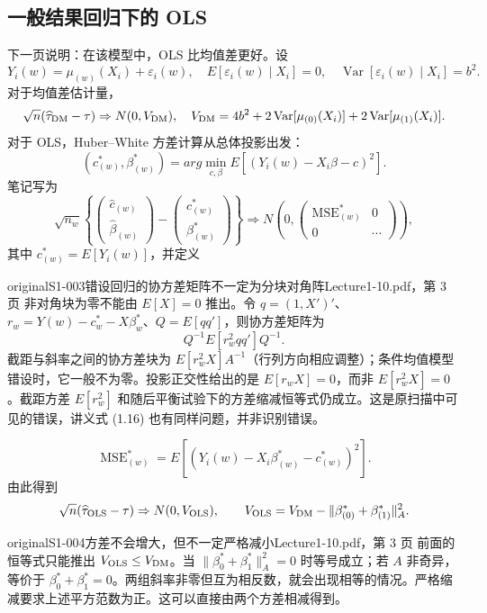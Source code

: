 \subsection{一般结果回归下的 OLS}
下一页说明：在该模型中，OLS 比均值差更好。设
\[
Y_i(w)=\mu_{(w)}(X_i)+\varepsilon_i(w),\quad
E[\varepsilon_i(w)\mid X_i]=0,\quad
\operatorname{Var}[\varepsilon_i(w)\mid X_i]=b^2.
\]
对于均值差估计量，
\[
\sqrt n(\widehat\tau_{\rm DM}-\tau)\Rightarrow N(0,V_{\rm DM}),\quad
V_{\rm DM}=4b^2+2\operatorname{Var}[\mu_{(0)}(X_i)]
+2\operatorname{Var}[\mu_{(1)}(X_i)].
\]
对于 OLS，Huber--White 方差计算从总体投影出发：
\[
(c^*_{(w)},\beta^*_{(w)})=arg\min_{c,\beta}
 E[(Y_i(w)-X_i\beta-c)^2].
\]
笔记写为
\[
\sqrt{n_w}\left\{\begin{pmatrix}\widehat c_{(w)}\\\widehat\beta_{(w)}\end{pmatrix}
-\begin{pmatrix}c^*_{(w)}\\\beta^*_{(w)}\end{pmatrix}\right\}
\Rightarrow N\left(0,\begin{pmatrix}\operatorname{MSE}^*_{(w)}&0\\0&\cdots\end{pmatrix}\right),
\]
其中 $c^*_{(w)}=E[Y_i(w)]$，并定义
\begin{reviewnote}{original}{S1-003}{错设回归的协方差矩阵不一定为分块对角阵}{Lecture1-10.pdf，第 3 页}
非对角块为零不能由 $E[X]=0$ 推出。令 $q=(1,X')'$、$r_w=Y(w)-c_w^*-X\beta_w^*$、$Q=E[qq']$，则协方差矩阵为
\[
Q^{-1}E[r_w^2qq']Q^{-1}.
\]
截距与斜率之间的协方差块为 $E[r_w^2X]A^{-1}$（行列方向相应调整）；条件均值模型错设时，它一般不为零。投影正交性给出的是 $E[r_wX]=0$，而非 $E[r_w^2X]=0$。截距方差 $E[r_w^2]$ 和随后平衡试验下的方差缩减恒等式仍成立。这是原扫描中可见的错误，讲义式 (1.16) 也有同样问题，并非识别错误。
\end{reviewnote}

\[
\operatorname{MSE}^*_{(w)}=E[(Y_i(w)-X_i\beta^*_{(w)}-c^*_{(w)})^2].
\]
由此得到
\[
\sqrt n(\widehat\tau_{\rm OLS}-\tau)\Rightarrow N(0,V_{\rm OLS}),\qquad
V_{\rm OLS}=V_{\rm DM}-\|\beta^*_{(0)}+\beta^*_{(1)}\|_A^2.
\]
\begin{reviewnote}{original}{S1-004}{方差不会增大，但不一定严格减小}{Lecture1-10.pdf，第 3 页}
前面的恒等式只能推出 $V_{\rm OLS}\le V_{\rm DM}$。当 $\|\beta_0^*+\beta_1^*\|_A^2=0$ 时等号成立；若 $A$ 非奇异，等价于 $\beta_0^*+\beta_1^*=0$。两组斜率非零但互为相反数，就会出现相等的情况。严格缩减要求上述平方范数为正。这可以直接由两个方差相减得到。
\end{reviewnote}


